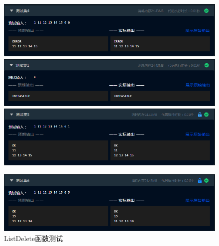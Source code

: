 \documentclass[supercite]{Experimental_Report}
\theoremstyle{definition}
\begin{document}
\begin{itemize}
\begin{figure}[htbp]
\begin{minipage}{0.9\linewidth}
		      \end{minipage}
		      \begin{minipage}{0.9\linewidth}
			      \centering
			      \includegraphics[width=0.9\linewidth]{images/test-35.png}
		      \end{minipage}
		      \begin{minipage}{0.9\linewidth}
			      \centering
			      \includegraphics[width=0.9\linewidth]{images/test-32.png}
		      \end{minipage}
		      \begin{minipage}{0.9\linewidth}
			      \centering
			      \includegraphics[width=0.9\linewidth]{images/test-36.png}
		      \end{minipage}
	      \end{figure}
	      \newpage
	      \begin{figure}[htbp]
		      \centering
		      \begin{minipage}{0.9\linewidth}
			      \centering
			      \includegraphics[width=0.9\linewidth]{images/test-37.png}
		      \end{minipage}
		      \caption{ListDelete函数测试}
		      \label{fig1-14}
	      \end{figure}

\end{itemize}
\end{document}
